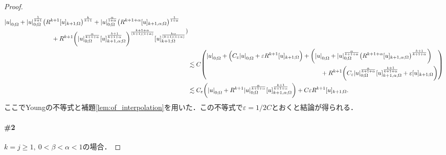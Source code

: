 \documentclass[a4paper]{ltjsarticle}
\newcommand{\Om}{\Omega}
\newcommand{\1}{\mathbbm{1}}
\numberwithin{equation}{section}
\theoremstyle{definition}
\begin{document}
\begin{proof}
\begin{align}
\begin{multlined}
            \abs{u}_{0;\Om}+\abs{u}_{0;\Om}^{\frac{1}{k+1}}\qty(R^{k+1}[u]_{k+1;\Om})^{\frac{k}{k+1}}+\abs{u}_{0;\Om}^{\frac{\alpha}{1+\alpha}}\qty(R^{k+1+\alpha}[u]_{k+1,\alpha;\Om})^{\frac{1}{1+\alpha}}\\
            +R^{k+1}\qty(\abs{u}_{0;\Om}^{\frac{\alpha}{k+1+\alpha}}[u]_{k+1,\alpha;\Om}^{\frac{k+1}{k+1+\alpha}})^{\frac{k+1+\alpha}{(k+1)(1+\alpha)}}[u]_{k+1;\Om}^{\frac{k\alpha}{(k+1)(1+\alpha)}}
        \end{multlined})\\
        &\lesssim C\qty(\begin{multlined}
            \abs{u}_{0;\Om}+\qty(C_\varepsilon\abs{u}_{0;\Om}+\varepsilon R^{k+1}[u]_{k+1;\Om})+\qty(\abs{u}_{0;\Om}+\abs{u}_{0;\Om}^{\frac{\alpha}{k+1+\alpha}}\qty(R^{k+1+\alpha}[u]_{k+1,\alpha;\Om})^{\frac{k+1}{k+1+\alpha}})\\
            +R^{k+1}\qty(C_\varepsilon\abs{u}_{0;\Om}^{\frac{\alpha}{k+1+\alpha}}[u]_{k+1,\alpha;\Om}^{\frac{k+1}{k+1+\alpha}}+\varepsilon[u]_{k+1;\Om})
        \end{multlined})\\
        &\lesssim C_\varepsilon\qty(\abs{u}_{0;\Om}+R^{k+1}\abs{u}_{0;\Om}^{\frac{\alpha}{k+1+\alpha}}[u]_{k+1,\alpha;\Om}^{\frac{k+1}{k+1+\alpha}})+C\varepsilon R^{k+1}[u]_{k+1;\Om}.
    \end{align}
    ここでYoungの不等式と補題\ref{lem:of_interpolation}を用いた．この不等式で$\varepsilon=1/2C$とおくと結論が得られる．

    \paragraph*{\#2}$k=j\geq1,\ 0<\beta<\alpha<1$の場合．


\end{proof}
\end{document}
